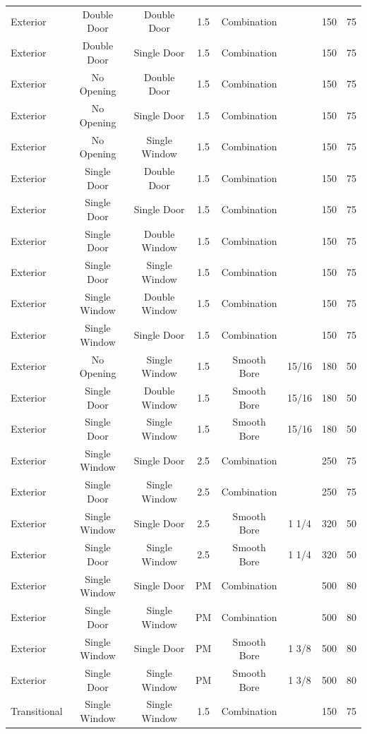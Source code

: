 \documentclass{article}
\begin{document}
\begin{table}[!ht]
{\begin{tabular}{|lccccccc|}
Exterior & Double Door & Double Door & 1.5 & Combination &  & 150 & 75 \\
Exterior & Double Door & Single Door & 1.5 & Combination &  & 150 & 75 \\
Exterior & No Opening & Double Door & 1.5 & Combination &  & 150 & 75 \\
Exterior & No Opening & Single Door & 1.5 & Combination &  & 150 & 75 \\
Exterior & No Opening & Single Window & 1.5 & Combination &  & 150 & 75 \\
Exterior & Single Door & Double Door & 1.5 & Combination &  & 150 & 75 \\
Exterior & Single Door & Single Door & 1.5 & Combination &  & 150 & 75 \\
Exterior & Single Door & Double Window & 1.5 & Combination &  & 150 & 75 \\
Exterior & Single Door & Single Window & 1.5 & Combination &  & 150 & 75 \\
Exterior & Single Window & Double Window & 1.5 & Combination &  & 150 & 75 \\
Exterior & Single Window & Single Door & 1.5 & Combination &  & 150 & 75 \\
Exterior & No Opening & Single Window & 1.5 & Smooth Bore & 15/16 & 180 & 50 \\
Exterior & Single Door & Double Window & 1.5 & Smooth Bore & 15/16 & 180 & 50 \\
Exterior & Single Door & Single Window & 1.5 & Smooth Bore & 15/16 & 180 & 50 \\
Exterior & Single Window & Single Door & 2.5 & Combination &  & 250 & 75 \\
Exterior & Single Door & Single Window & 2.5 & Combination &  & 250 & 75 \\
Exterior & Single Window & Single Door & 2.5 & Smooth Bore & 1 1/4 & 320 & 50 \\
Exterior & Single Door & Single Window & 2.5 & Smooth Bore & 1 1/4 & 320 & 50 \\
Exterior & Single Window & Single Door & PM & Combination &  & 500 & 80 \\
Exterior & Single Door & Single Window & PM & Combination &  & 500 & 80 \\
Exterior & Single Window & Single Door & PM & Smooth Bore & 1 3/8 & 500 & 80 \\
Exterior & Single Door & Single Window & PM & Smooth Bore & 1 3/8 & 500 & 80 \\
Transitional & Single Window & Single Window & 1.5 & Combination &  & 150 & 75 \\

\end{tabular}}
\end{table}
\end{document}
